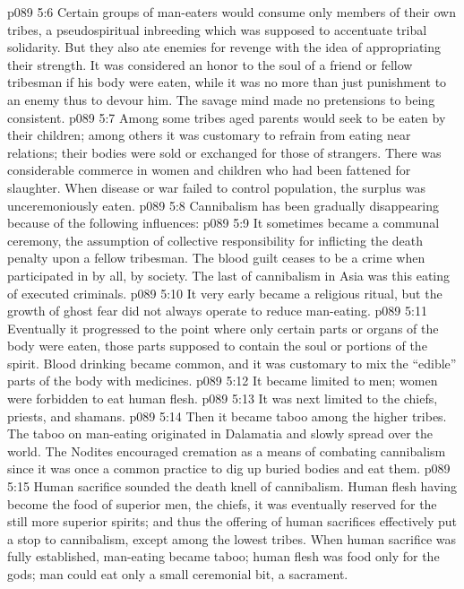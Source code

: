 \vs p089 5:6 Certain groups of man\hyp{}eaters would consume only members of their own tribes, a pseudospiritual inbreeding which was supposed to accentuate tribal solidarity. But they also ate enemies for revenge with the idea of appropriating their strength. It was considered an honor to the soul of a friend or fellow tribesman if his body were eaten, while it was no more than just punishment to an enemy thus to devour him. The savage mind made no pretensions to being consistent.
\vs p089 5:7 Among some tribes aged parents would seek to be eaten by their children; among others it was customary to refrain from eating near relations; their bodies were sold or exchanged for those of strangers. There was considerable commerce in women and children who had been fattened for slaughter. When disease or war failed to control population, the surplus was unceremoniously eaten.
\vs p089 5:8 \pc Cannibalism has been gradually disappearing because of the following influences:
\vs p089 5:9 \bibnobreakspace It sometimes became a communal ceremony, the assumption of collective responsibility for inflicting the death penalty upon a fellow tribesman. The blood guilt ceases to be a crime when participated in by all, by society. The last of cannibalism in Asia was this eating of executed criminals.
\vs p089 5:10 \pc {}\bibnobreakspace It very early became a religious ritual, but the growth of ghost fear did not always operate to reduce man\hyp{}eating.
\vs p089 5:11 \pc {}\bibnobreakspace Eventually it progressed to the point where only certain parts or organs of the body were eaten, those parts supposed to contain the soul or portions of the spirit. Blood drinking became common, and it was customary to mix the “edible” parts of the body with medicines.
\vs p089 5:12 \pc {}\bibnobreakspace It became limited to men; women were forbidden to eat human flesh.
\vs p089 5:13 \pc {}\bibnobreakspace It was next limited to the chiefs, priests, and shamans.
\vs p089 5:14 \pc {}\bibnobreakspace Then it became taboo among the higher tribes. The taboo on man\hyp{}eating originated in Dalamatia and slowly spread over the world. The Nodites encouraged cremation as a means of combating cannibalism since it was once a common practice to dig up buried bodies and eat them.
\vs p089 5:15 \pc {}\bibnobreakspace Human sacrifice sounded the death knell of cannibalism. Human flesh having become the food of superior men, the chiefs, it was eventually reserved for the still more superior spirits; and thus the offering of human sacrifices effectively put a stop to cannibalism, except among the lowest tribes. When human sacrifice was fully established, man\hyp{}eating became taboo; human flesh was food only for the gods; man could eat only a small ceremonial bit, a sacrament.
